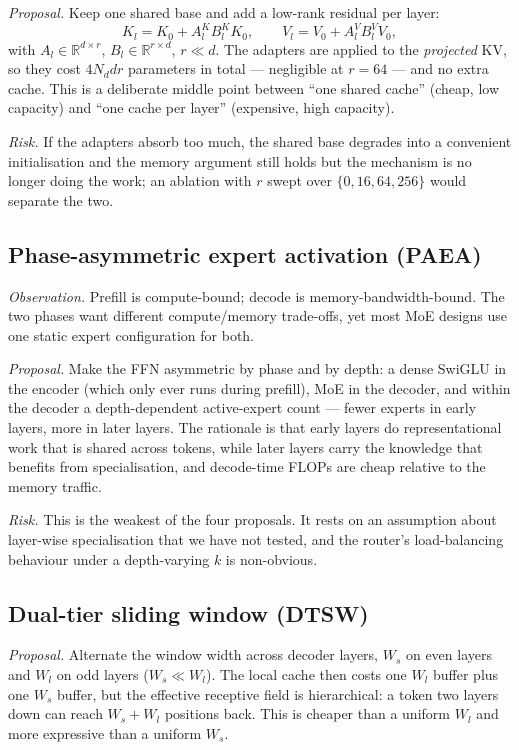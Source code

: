 \documentclass[10pt,conference]{IEEEtran}
\begin{document}
\emph{Proposal.} Keep one shared base and add a low-rank residual per layer:
\begin{equation}
K_l = K_0 + A^K_l B^K_l K_0, \qquad V_l = V_0 + A^V_l B^V_l V_0,
\end{equation}
with $A_l \in \mathbb{R}^{d \times r}$, $B_l \in \mathbb{R}^{r \times d}$, $r \ll d$.
The adapters are applied to the \emph{projected} KV, so they cost
$4 N_d d r$ parameters in total --- negligible at $r = 64$ --- and no extra cache.
This is a deliberate middle point between ``one shared cache'' (cheap, low capacity)
and ``one cache per layer'' (expensive, high capacity).

\emph{Risk.} If the adapters absorb too much, the shared base degrades into a
convenient initialisation and the memory argument still holds but the mechanism is no
longer doing the work; an ablation with $r$ swept over $\{0, 16, 64, 256\}$ would
separate the two.

\subsection{Phase-asymmetric expert activation (PAEA)}

\emph{Observation.} Prefill is compute-bound; decode is memory-bandwidth-bound. The two
phases want different compute/memory trade-offs, yet most MoE designs use one static
expert configuration for both.

\emph{Proposal.} Make the FFN asymmetric by phase and by depth: a dense SwiGLU in the
encoder (which only ever runs during prefill), MoE in the decoder, and within the
decoder a depth-dependent active-expert count --- fewer experts in early layers, more
in later layers. The rationale is that early layers do representational work that is
shared across tokens, while later layers carry the knowledge that benefits from
specialisation, and decode-time FLOPs are cheap relative to the memory traffic.

\emph{Risk.} This is the weakest of the four proposals. It rests on an assumption about
layer-wise specialisation that we have not tested, and the router's load-balancing
behaviour under a depth-varying $k$ is non-obvious.

\subsection{Dual-tier sliding window (DTSW)}

\emph{Proposal.} Alternate the window width across decoder layers, $W_s$ on even layers
and $W_l$ on odd layers ($W_s \ll W_l$). The local cache then costs one $W_l$ buffer
plus one $W_s$ buffer, but the effective receptive field is hierarchical: a token two
layers down can reach $W_s + W_l$ positions back. This is cheaper than a uniform $W_l$
and more expressive than a uniform $W_s$.
\end{document}
